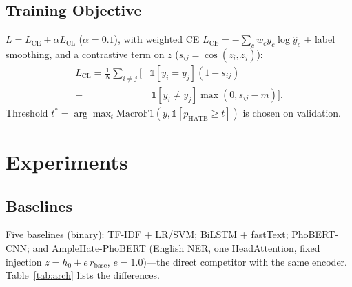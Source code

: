\documentclass[11pt]{article}
\begin{document}
\subsection{Training Objective}
$L = L_{\mathrm{CE}} + \alpha L_{\mathrm{CL}}$ ($\alpha=0.1$), with weighted CE $L_{\mathrm{CE}}=-\sum_c w_c y_c\log\hat y_c$ + label smoothing, and a contrastive term on $z$ ($s_{ij}=\cos(z_i,z_j)$):
\begin{equation}
\begin{split}
  L_{\mathrm{CL}} = \frac{1}{N}\sum_{i\neq j}\big[&\mathbb{1}[y_i{=}y_j](1-s_{ij}) \\[-2pt]
   + &\,\mathbb{1}[y_i{\neq}y_j]\max(0, s_{ij}-m)\big].
\end{split}
\end{equation}
Threshold $t^{*} = \arg\max_t \mathrm{MacroF1}(y, \mathbb{1}[p_{\mathrm{HATE}}\ge t])$ is chosen on validation.

\section{Experiments}

\subsection{Baselines}
Five baselines (binary): TF-IDF + LR/SVM; BiLSTM + fastText; PhoBERT-CNN; and AmpleHate-PhoBERT (English NER, one HeadAttention, fixed injection $z=h_0+e\,r_{\mathrm{base}}$, $e=1.0$)---the direct competitor with the same encoder. Table~\ref{tab:arch} lists the differences.
\end{document}

